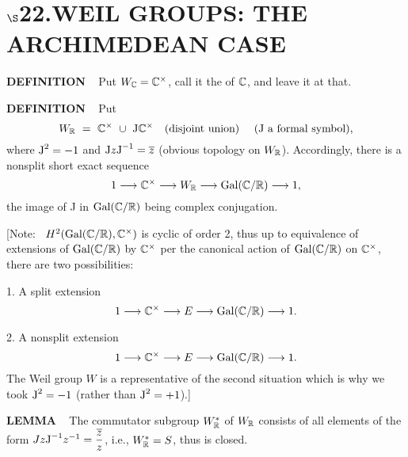 \chapter{
$\boldsymbol{\S}$\textbf{22}.\quad  WEIL GROUPS: THE ARCHIMEDEAN CASE}
\setlength\parindent{2em}
\setcounter{theoremn}{0}


\begin{x}{\small\bf DEFINITION} \ %
Put $W_{\mathbb{C}} = \mathbb{C}^\times$, call it the 
of $\mathbb{C}$, and leave it at that.
\end{x}

\vspace{0.1cm}

\begin{x}{\small\bf DEFINITION} \ %
Put 
\[
W_{\mathbb{R}} \ = \ \mathbb{C}^\times \ \cup \ \text{J} \mathbb{C}^\times \quad \text{(disjoint union) \quad (J a formal symbol)},
\]
where $\text{J}^2 = -1$ and $\text{J} z \text{J}^{-1} = \overline{z}$ (obvious topology on $W_{\mathbb{R}}$).  Accordingly, there is a nonsplit short exact sequence
\[
1 \longrightarrow \mathbb{C}^\times \longrightarrow W_{\mathbb{R}} \longrightarrow \text{Gal}(\mathbb{C} / \mathbb{R}) \longrightarrow 1, 
\]
the image of J in $\text{Gal}(\mathbb{C} / \mathbb{R})$ being complex conjugation.

\vspace{0.1cm}

[Note: \ $H^2(\text{Gal}(\mathbb{C} / \mathbb{R}),\mathbb{C}^\times)$ is cyclic of order 2, thus up to equivalence of extensions of $\text{Gal}(\mathbb{C} / \mathbb{R})$ by 
$\mathbb{C}^\times$ per the canonical action of $\text{Gal}(\mathbb{C} / \mathbb{R})$ on $\mathbb{C}^\times$, there are two possibilities:

\vspace{0.2cm}

1. \quad A split extension
\[
1 \longrightarrow \mathbb{C}^\times \longrightarrow E \longrightarrow \text{Gal}(\mathbb{C} / \mathbb{R}) \longrightarrow 1.
\]

2. \quad A nonsplit extension
\[
1 \longrightarrow \mathbb{C}^\times \longrightarrow E \longrightarrow \text{Gal}(\mathbb{C} / \mathbb{R}) \longrightarrow 1.
\]
The Weil group $W$ is a representative of the second situation which is why we took $\text{J}^2 = -1$ 
(rather than $\text{J}^2 = +1$).]
\end{x}
\vspace{0.1cm}

\begin{x}{\small\bf LEMMA} \ %
The commutator subgroup $W_{\mathbb{R}}^*$ of $W_{\mathbb{R}}$ consists of all elements of the form 
$J z \text{J}^{-1} z^{-1} = \displaystyle\frac{\overline{z}}{z}$, i.e., $W_{\mathbb{R}}^* = S$, thus is closed.
\end{x}
\vspace{0.1cm}


